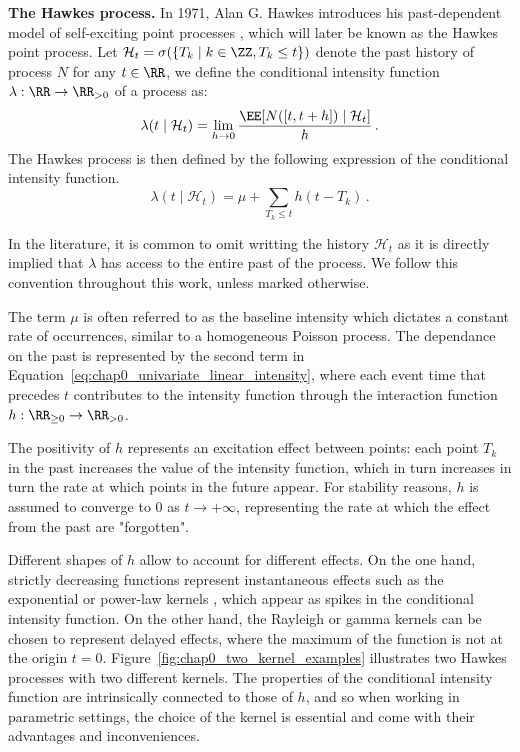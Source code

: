     \textbf{The Hawkes process.}
    In 1971, Alan G. Hawkes introduces his past-dependent model of self-exciting point processes \parencite{Hawkes1971}, which will later be known as the Hawkes point process.
    Let $\mathcal{H}_t = \sigma(\{T_k \mid k\in\ZZ, T_k \leq t\})$ denote the past history of process $N$ for any $t\in\RR$, we define the conditional intensity function $\lambda:\RR\to\RR_{>0}$ of a process as:
    \[        \lambda(t \mid \mathcal{H}_t) = \lim_{h \to 0}{\frac{\EE[N([t,t+h]) \mid \mathcal{H}_t]}{h}}\,.
    \]
    The Hawkes process is then defined by the following expression of the conditional intensity function.
    \begin{equation}\label{eq:chap0_univariate_linear_intensity}
        \lambda(t\mid \mathcal{H}_t) = \mu + \sum_{T_k \leq t}{h(t-T_k)}\,.
    \end{equation}

    \begin{remark}
      In the literature, it is common to omit writting the history $\mathcal{H}_t$ as it is directly implied that $\lambda$ has access to the entire past of the process.
      We follow this convention throughout this work, unless marked otherwise.
    \end{remark}

    The term $\mu$ is often referred to as the baseline intensity which dictates a constant rate of occurrences, similar to a homogeneous Poisson process. 
    The dependance on the past is represented by the second term in Equation~\eqref{eq:chap0_univariate_linear_intensity}, where each event time that precedes $t$ contributes to the intensity function through the interaction function $h:\RR_{\geq0}\to\RR_{>0}$.

    The positivity of $h$ represents an excitation effect between points: each point $T_k$ in the past increases the value of the intensity function, which in turn increases in turn the rate at which points in the future appear.
    For stability reasons, $h$ is assumed to converge to $0$ as $t\to+\infty$, representing the rate at which the effect from the past are "forgotten".

    Different shapes of $h$ allow to account for different effects. 
    On the one hand, strictly decreasing functions represent instantaneous effects such as the exponential \parencite{Ozaki1979, Ogata1988} or power-law kernels \parencite{Zhang2016}, which appear as spikes in the conditional intensity function. 
    On the other hand, the Rayleigh or gamma kernels \parencite{Lesage2022} can be chosen to represent delayed effects, where the maximum of the function is not at the origin $t=0$. Figure~\ref{fig:chap0_two_kernel_examples} illustrates two Hawkes processes with two different kernels.
    The properties of the conditional intensity function are intrinsically connected to those of $h$, and so when working in parametric settings, the choice of the kernel is essential and come with their advantages and inconveniences.


